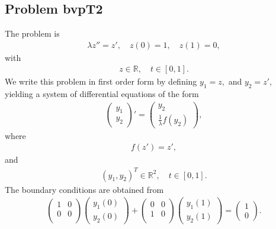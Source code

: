 \documentclass[<options>]{article}
\begin{document}
\subsection{Problem bvpT2}\label{test2}
The problem is 
\begin{equation*}
\begin{matrix}
\lambda z''  =  z', \quad z(0)=1, \quad z(1)=0,
\end{matrix}
\end{equation*}
with
\begin{equation*}
\begin{matrix}
z \in \mathbb{R}, \quad  t\in [0,1].
\end{matrix}
\end{equation*}
We write this problem in first order form by defining $y_1=z,$ and $y_2=z',$ yielding a system of differential equations of the form
\begin{equation*}
\begin{matrix}
\left(\begin{matrix}
y_1\\
y_2
\end{matrix}\right)'=
\left(\begin{matrix}
y_2\\
\frac{1}{\lambda}f(y_2)
\end{matrix}\right),
\end{matrix}
\end{equation*}
where
\begin{equation*}
\begin{matrix}
f(z')= z',
\end{matrix}
\end{equation*}
and
\begin{equation*}
\begin{matrix}
(y_1,y_2)^T \in \mathbb{R}^{2}, \quad  t \in [0,1].
\end{matrix}
\end{equation*}
The boundary conditions are obtained from
\begin{equation*}
\begin{matrix}
\left(
  \begin{matrix}
    1 & 0 \\
    0 & 0 \\
  \end{matrix}
\right)
\left(\begin{matrix}
y_{1}(0)\\
y_{2}(0)
\end{matrix}\right)
+
\left(
  \begin{matrix}
    0 & 0 \\
    1 & 0 \\
  \end{matrix}
\right)
\left(\begin{matrix}
y_{1}(1)\\
y_{2}(1)
\end{matrix}\right)=\left(\begin{matrix}
1 \\
0
\end{matrix}\right).
\end{matrix}
\end{equation*}
\end{document}

